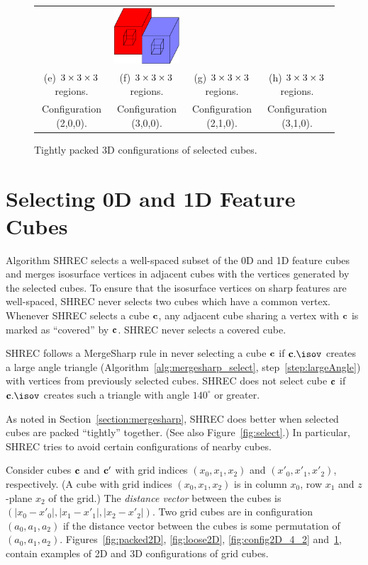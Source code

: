 \begin{figure}
\begin{tabular}{cccc}
\qquad &
\qquad
\includegraphics[width=1.2in]{images/config3D_3_1_0_3x3x3.eps} \\
(e) $3 \times 3 \times 3$ regions. & (f) $3 \times 3 \times 3$ regions. 
  & (g) $3 \times 3 \times 3$ regions. & (h) $3 \times 3 \times 3$ regions.\\
Configuration (2,0,0). & Configuration (3,0,0). 
  & Configuration (2,1,0). & Configuration (3,1,0).
\end{tabular}
\caption{Tightly packed 3D configurations of selected cubes.}
\label{fig:packed3D}
\end{figure}


\section{Selecting 0D and 1D Feature Cubes}
\label{section:selection}

Algorithm SHREC selects a well-spaced subset 
of the 0D and 1D feature cubes
and merges isosurface vertices in adjacent cubes 
with the vertices generated by the selected cubes.
To ensure that the isosurface vertices on sharp features are well-spaced,
SHREC never selects two cubes which have a common vertex.
Whenever SHREC selects a cube $\mathbf{c}$,
any adjacent cube sharing a vertex with $\mathbf{c}$ is marked as ``covered''
by $\mathbf{c}$.
SHREC never selects a covered cube.

SHREC follows a MergeSharp rule in never selecting a cube $\mathbf{c}$
if $\cb.\isov$ creates a large angle triangle 
(Algorithm~\ref{alg:mergesharp_select}, step~\ref{step:largeAngle})
with vertices from previously selected cubes.
SHREC does not select cube $\mathbf{c}$
if $\cb.\isov$ creates such a triangle with angle $140^\circ$ or greater.

As noted in Section~\ref{section:mergesharp}, 
SHREC does better when selected cubes 
are packed ``tightly'' together.
(See also Figure~\ref{fig:select}.)
In particular, SHREC tries to avoid certain configurations of nearby cubes.

Consider cubes $\mathbf{c}$ and $\mathbf{c}'$ with grid indices $(x_0,x_1,x_2)$
and $(x'_0,x'_1,x'_2)$, respectively.
(A cube with grid indices $(x_0,x_1,x_2)$ is in column $x_0$, row $x_1$
and $z$-plane $x_2$ of the grid.)
The {\em distance vector} between the cubes is
$(|x_0-x'_0|, |x_1-x'_1|, |x_2-x'_2|)$.
Two grid cubes are in configuration $(a_0,a_1,a_2)$ if the distance vector
between the cubes is some permutation of $(a_0,a_1,a_2)$.
Figures~\ref{fig:packed2D}, \ref{fig:loose2D}, \ref{fig:config2D_4_2}
and~\ref{fig:packed3D},
contain examples of 2D and 3D configurations of grid cubes.

